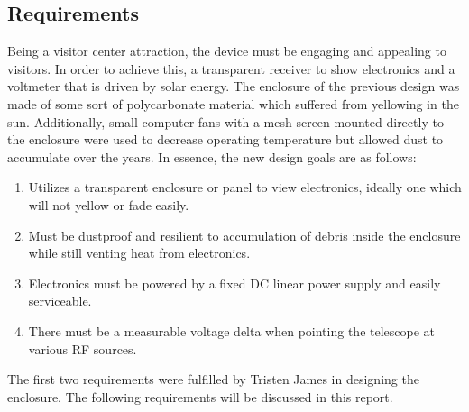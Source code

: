 \documentclass[titlepage]{article}
\begin{document}
\subsection{Requirements}
Being a visitor center attraction, the device must be engaging and appealing to visitors. In order to achieve this, a transparent receiver to show electronics and a voltmeter that is driven by solar energy. The enclosure of the previous design was made of some sort of polycarbonate material which suffered from yellowing in the sun. Additionally, small computer fans with a mesh screen mounted directly to the enclosure were used to decrease operating temperature but allowed dust to accumulate over the years. In essence, the new design goals are as follows:
\begin{enumerate}
    \item Utilizes a transparent enclosure or panel to view electronics, ideally one which will not yellow or fade easily.
    \item Must be dustproof and resilient to accumulation of debris inside the enclosure while still venting heat from electronics.
    \item Electronics must be powered by a fixed DC linear power supply and easily serviceable.
    \item There must be a measurable voltage delta when pointing the telescope at various RF sources.
\end{enumerate}
The first two requirements were fulfilled by Tristen James in designing the enclosure. The following requirements will be discussed in this report.
\end{document}
